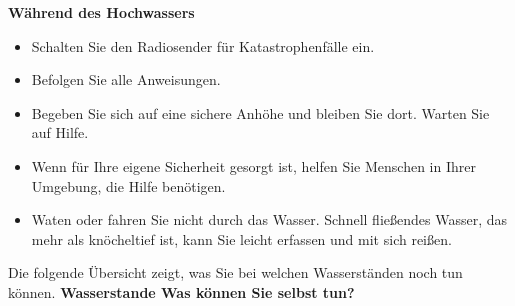 \textnormal{\newline\bfseries Während des Hochwassers}
\begin{itemize}  
  \item  Schalten Sie den Radiosender für Katastrophenfälle ein.
   \item Befolgen Sie alle Anweisungen.
  \item  Begeben Sie sich auf eine sichere Anhöhe und bleiben Sie dort. Warten Sie auf Hilfe.
 \item   Wenn für Ihre eigene Sicherheit gesorgt ist, helfen Sie Menschen in Ihrer Umgebung, die Hilfe benötigen.
  \item  Waten oder fahren Sie nicht durch das Wasser. Schnell fließendes Wasser, das mehr als knöcheltief ist, kann Sie leicht erfassen und mit sich reißen.
\end{itemize}   
\textnormal{Die folgende Übersicht zeigt, was Sie bei welchen 
Wasserständen noch tun können.}
\newline
\textnormal{\newline\bfseries Wasserstande Was können Sie selbst tun?}
\newline
